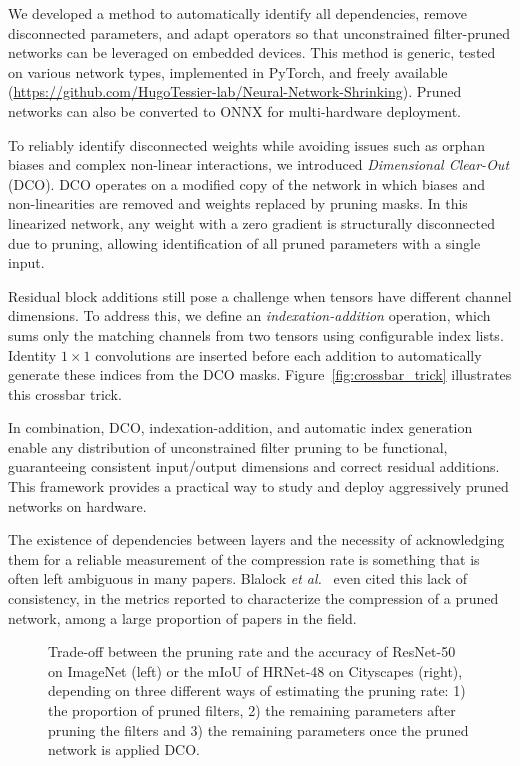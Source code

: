 \documentclass[11pt]{report}
\begin{document}
We developed a method to automatically identify all dependencies, remove disconnected parameters, and adapt operators so that unconstrained filter-pruned networks can be leveraged on embedded devices. This method is generic, tested on various network types, implemented in PyTorch, and freely available (\url{https://github.com/HugoTessier-lab/Neural-Network-Shrinking}). Pruned networks can also be converted to ONNX for multi-hardware deployment.

To reliably identify disconnected weights while avoiding issues such as orphan biases and complex non-linear interactions, we introduced \textit{Dimensional Clear-Out} (DCO). DCO operates on a modified copy of the network in which biases and non-linearities are removed and weights replaced by pruning masks. In this linearized network, any weight with a zero gradient is structurally disconnected due to pruning, allowing identification of all pruned parameters with a single input.

Residual block additions still pose a challenge when tensors have different channel dimensions. To address this, we define an \textit{indexation-addition} operation, which sums only the matching channels from two tensors using configurable index lists. Identity $1\times1$ convolutions are inserted before each addition to automatically generate these indices from the DCO masks. Figure~\ref{fig:crossbar_trick} illustrates this crossbar trick.

In combination, DCO, indexation-addition, and automatic index generation enable any distribution of unconstrained filter pruning to be functional, guaranteeing consistent input/output dimensions and correct residual additions. This framework provides a practical way to study and deploy aggressively pruned networks on hardware.



The existence of dependencies between layers and the necessity of acknowledging them for a reliable measurement of the compression rate is something that is often left ambiguous in many papers. Blalock \textit{et al.}~\cite{blalock2020state} even cited this lack of consistency, in the metrics reported to characterize the compression of a pruned network, among a large proportion of papers in the field.



\begin{figure}[ht]
  \centering
  
  \caption{Trade-off between the pruning rate and the accuracy of ResNet-50 on ImageNet (left) or the mIoU of HRNet-48 on Cityscapes (right), depending on three different ways of estimating the pruning rate: 1) the proportion of pruned filters, 2) the remaining parameters after pruning the filters and 3) the remaining parameters once the pruned network is applied DCO.}
  \label{fig:sips_accuracy}
\end{figure}
\end{document}
